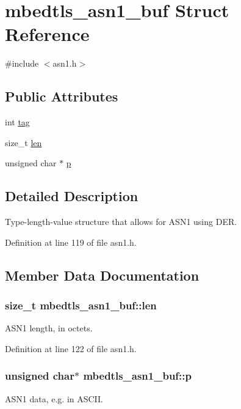 \hypertarget{structmbedtls__asn1__buf}{\section{mbedtls\-\_\-asn1\-\_\-buf Struct Reference}
\label{structmbedtls__asn1__buf}
}


{\ttfamily \#include $<$asn1.\-h$>$}

\subsection*{Public Attributes}
\begin{DoxyCompactItemize}
\item 
int \hyperlink{structmbedtls__asn1__buf_abcca2df9a773acd5b59831ac55993dd1}{tag}
\item 
size\-\_\-t \hyperlink{structmbedtls__asn1__buf_a046821787f2c5ecbf2df9f15e0d9486c}{len}
\item 
unsigned char $\ast$ \hyperlink{structmbedtls__asn1__buf_a0af0cf9b0801a21ce4652e859876f195}{p}
\end{DoxyCompactItemize}


\subsection{Detailed Description}
Type-\/length-\/value structure that allows for A\-S\-N1 using D\-E\-R. 

Definition at line 119 of file asn1.\-h.



\subsection{Member Data Documentation}
\hypertarget{structmbedtls__asn1__buf_a046821787f2c5ecbf2df9f15e0d9486c}{
\subsubsection[{len}]{\setlength{\rightskip}{0pt plus 5cm}size\-\_\-t mbedtls\-\_\-asn1\-\_\-buf\-::len}}\label{structmbedtls__asn1__buf_a046821787f2c5ecbf2df9f15e0d9486c}
A\-S\-N1 length, in octets. 

Definition at line 122 of file asn1.\-h.

\hypertarget{structmbedtls__asn1__buf_a0af0cf9b0801a21ce4652e859876f195}{
\subsubsection[{p}]{\setlength{\rightskip}{0pt plus 5cm}unsigned char$\ast$ mbedtls\-\_\-asn1\-\_\-buf\-::p}}\label{structmbedtls__asn1__buf_a0af0cf9b0801a21ce4652e859876f195}
A\-S\-N1 data, e.\-g. in A\-S\-C\-I\-I. 

